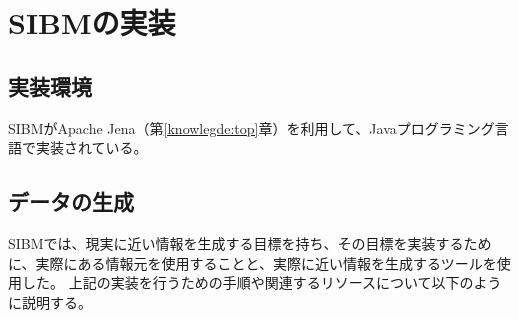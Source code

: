\section{SIBMの実装}
\label{sibm:implements}

\subsection{実装環境}

SIBMがApache Jena（第\ref{knowlegde:top}章）を利用して、Javaプログラミング言語で実装されている。

\subsection{データの生成}

SIBMでは、現実に近い情報を生成する目標を持ち、その目標を実装するために、実際にある情報元を使用することと、実際に近い情報を生成するツールを使用した。
上記の実装を行うための手順や関連するリソースについて以下のように説明する。

